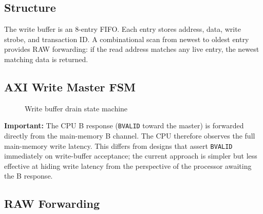 \documentclass[12pt,letterpaper]{report}
\begin{document}
\subsection{Structure}

The write buffer is an 8-entry FIFO.  Each entry stores address, data,
write strobe, and transaction ID.  A combinational scan from newest
to oldest entry provides RAW forwarding: if the read address matches
any live entry, the newest matching data is returned.

\subsection{AXI Write Master FSM}

\begin{figure}[h]
\centering
{}
\caption{Write buffer drain state machine}
\label{fig:wbuf_fsm}
\end{figure}

\noindent\textbf{Important:} The CPU B response (\texttt{BVALID}
toward the master) is forwarded directly from the main-memory B
channel.  The CPU therefore observes the full main-memory write
latency.  This differs from designs that assert \texttt{BVALID}
immediately on write-buffer acceptance; the current approach is
simpler but less effective at hiding write latency from the
perspective of the processor awaiting the B response.

\subsection{RAW Forwarding}
\end{document}
